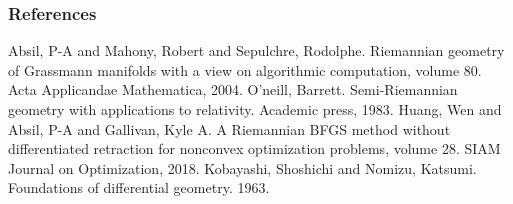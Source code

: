 \documentclass[notheorems,envcountsect,pdfpagemode=FullScreen,12pt]{beamer}
\theoremstyle{plain}
\theoremstyle{definition}
\theoremstyle{example}
\begin{document}
\begin{frame}
\frametitle{References}
\begin{thebibliography}{99}
 Absil, P-A and Mahony, Robert and Sepulchre, Rodolphe. Riemannian geometry of Grassmann manifolds with a view on algorithmic computation, volume 80. Acta Applicandae Mathematica, 2004.
 O'neill, Barrett. Semi-Riemannian geometry with applications to relativity. Academic press, 1983.
 Huang, Wen and Absil, P-A and Gallivan, Kyle A. A Riemannian BFGS method without differentiated retraction for nonconvex optimization problems, volume 28. SIAM Journal on Optimization, 2018.
 Kobayashi, Shoshichi and Nomizu, Katsumi. Foundations of differential geometry. 1963.
\end{thebibliography}
\end{frame}

\begin{frame}	
\end{frame}
\end{document}
